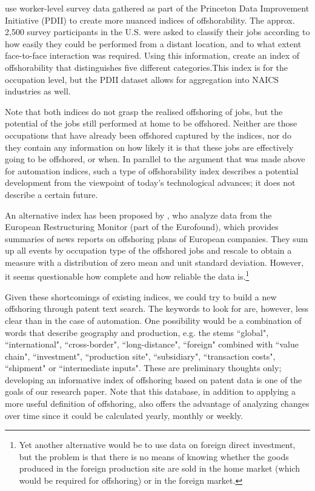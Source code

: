 \documentclass[11pt,a4paper,fleqn]{article}
\begin{document}
\cite{BK2013} use worker-level survey data gathered as part of the Princeton Data Improvement Initiative (PDII) to create more nuanced indices of offshorability. The approx. 2,500 survey participants in the U.S. were asked to classify their jobs according to how easily they could be performed from a distant location, and to what extent face-to-face interaction was required. Using this information, \cite{BK2013} create an index of offshorability that distinguishes five different categories.This index is for the occupation level, but the PDII dataset allows for aggregation into NAICS industries as well. 

Note that both indices do not grasp the realised offshoring of jobs, but the potential of the jobs still performed at home to be offshored. Neither are those occupations that have already been offshored captured by the indices, nor do they contain any information on how likely it is that these jobs are effectively going to be offshored, or when. In parallel to the argument that was made above for automation indices, such a type of offshorability index describes a potential development from the viewpoint of today's technological advances; it does not describe a certain future.

An alternative index has been proposed by \cite{GMS2014}, who analyze data from the European Restructuring Monitor (part of the Eurofound), which provides summaries of news reports on offshoring plans of European companies. They sum up all events by occupation type of the offshored jobs and rescale to obtain a measure with a distribution of zero mean and unit standard deviation. However, it seems questionable how complete and how reliable the data is.\footnote{Yet another alternative would be to use data on foreign direct investment, but the problem is that there is no means of knowing whether the goods produced in the foreign production site are sold in the home market (which would be required for offshoring) or in the foreign market.}

Given these shortcomings of existing indices, we could try to build a new offshoring through patent text search. The keywords to look for are, however, less clear than in the case of automation. One possibility would be a combination of words that describe geography and production, e.g. the stems ``global", ``international", ``cross-border", ``long-distance", ``foreign" combined with ``value chain", ``investment", ``production site", ``subsidiary", ``transaction costs", ``shipment" or ``intermediate inputs". These are preliminary thoughts only; developing an informative index of offshoring based on patent data is one of the goals of our research paper. Note that this database, in addition to applying a more useful definition of offshoring, also offers the advantage of analyzing changes over time since it could be calculated yearly, monthly or weekly.
\end{document}
